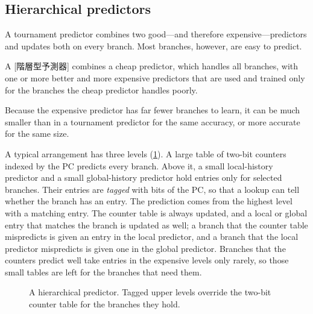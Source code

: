 \documentclass[../main.tex]{subfiles}
\begin{document}
\subsection{Hierarchical predictors}

A tournament predictor combines two good---and therefore expensive---predictors
and updates both on every branch.  Most branches, however, are easy to
predict.

\begin{definition}
  A [階層型予測器] combines a cheap predictor,
  which handles all branches, with one or more better and more expensive
  predictors that are used and trained only for the branches the cheap
  predictor handles poorly.
\end{definition}

Because the expensive predictor has far fewer branches to learn, it can be
much smaller than in a tournament predictor for the same accuracy, or more
accurate for the same size.

A typical arrangement has three levels (\cref{fig:l04-hierarchical}).  A large
table of two-bit counters indexed by the PC predicts every branch.  Above it,
a small local-history predictor and a small global-history predictor hold
entries only for selected branches.  Their entries are \emph{tagged} with
bits of the PC, so that a lookup can tell whether the branch has an entry.
The prediction comes from the highest level with a matching entry.  The
counter table is always updated, and a local or global entry that matches
the branch is updated as well; a branch that the counter table mispredicts
is given an entry in the local predictor, and a branch that the local
predictor mispredicts is given one in the global predictor.  Branches that
the counters predict well take entries in the expensive levels only rarely,
so those small tables are left for the branches that need
them.

\begin{figure}[htbp]
  \centering
  
  \caption{A hierarchical predictor.  Tagged upper levels override the
    two-bit counter table for the branches they hold.}
  \label{fig:l04-hierarchical}
\end{figure}
\end{document}
